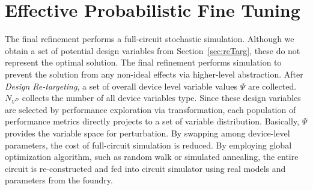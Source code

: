                                             
\section{Effective Probabilistic Fine Tuning}\label{sec:pss}


  The final refinement performs a full-circuit stochastic simulation. Although we obtain a set of potential design variables from Section~\ref{sec:reTarg}, these do not represent the optimal solution. The final refinement performs simulation to prevent the solution from any non-ideal effects via higher-level abstraction. After {\it Design Re-targeting}, a set of overall device level variable values $\Psi $ are collected. $N_{V^D}$ collects the number of all device variables type. Since these design variables are selected by performance exploration via transformation, each population of performance metrics directly projects to a set of variable distribution. Basically, $\Psi$ provides the variable space for perturbation. By swapping among device-level parameters, the cost of full-circuit simulation is reduced. By employing global optimization algorithm, such as random walk or simulated annealing, the entire circuit is re-constructed and fed into circuit simulator using real models and parameters from the foundry.

